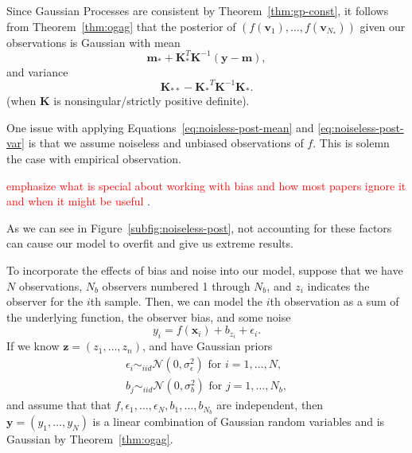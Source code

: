 Since Gaussian Processes are consistent by Theorem~\ref{thm:gp-const}, it follows from Theorem~\ref{thm:ogag} that the posterior
of $(f(\mathbf{v}_1), \dots, f(\mathbf{v}_{N_*}))$ given our observations is Gaussian with mean
\begin{equation}
    \label{eq:noisless-post-mean}
    \mathbf{m}_* + \mathbf{K}_*^T \mathbf{K}^{-1} (\mathbf{y} - \mathbf{m}),
\end{equation}
and variance
\begin{equation}
    \label{eq:noiseless-post-var}
    \mathbf{K}_{* *} - \mathbf{K_*}^{T} \mathbf{K}^{-1} \mathbf{K_*}.
\end{equation}
(when $\mathbf{K}$ is nonsingular/strictly positive definite).

One issue with applying Equations~\ref{eq:noisless-post-mean} and \ref{eq:noiseless-post-var} is that we assume noiseless and unbiased observations of $f$.
This is solemn the case with empirical observation.

\textcolor{red}{emphasize what is special about working with bias and how most papers ignore it and when it might be useful }.

As we can see in Figure~\ref{subfig:noiseless-post}, not accounting for these factors can cause our model to overfit and give us extreme results.

To incorporate the effects of bias and noise into our model, suppose that we have $N$ observations, $N_b$ observers numbered 1 through $N_b$, and $z_i$ indicates the observer for the $i$th sample.
Then, we can model the $i$th observation as a sum of the underlying function, the observer bias, and some noise
\begin{equation*}
    y_i = f(\mathbf{x}_i) + b_{z_i} + \epsilon_i.
\end{equation*}
If we know $\mathbf{z} = (z_1, \dots, z_n)$, and have Gaussian priors
\begin{align*}
    \epsilon_i \sim_{iid} \mathcal{N}(0, \sigma^2_{\epsilon}) \text{ for $i = 1, \dots, N$}, \\
    b_j \sim_{iid} \mathcal{N}(0, \sigma_{b}^2) \text{ for $j = 1, \dots, N_b$},
\end{align*}
and assume that that $f, \epsilon_1, \dots, \epsilon_N, b_1, \dots, b_{N_b}$ are independent,
then $\mathbf{y} = (y_1, \dots, y_N)$ is a linear combination of Gaussian random variables
and is Gaussian by Theorem~\ref{thm:ogag}.

